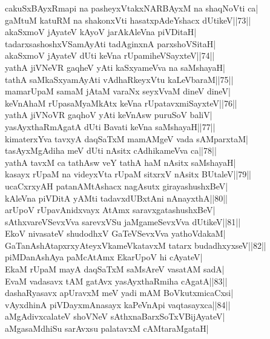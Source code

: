\documentclass{article}
\begin{document}
cakuSxBAyxRmapi na pasheyxVtakxNARBAyxM na shaqNoVti ca|\\
gaMtuM katuRM na shakonxVti hasatxpAdeYshacx dUtikeV||73||\\
akaSxmoV jAyateV kAyoV jarAkAleVna piVDitaH|\\
tadarxsashoshxVSamAyAti tadAginxnA parxshoVSitaH|\\
akaSxmoV jAyateV dUti keVna rUpamiheVSayxteV||74||\\
yathA jiVNeVR gaqheV yAti kaSxyameVva na saMshayaH|\\
tathA saMkaSxyamAyAti vAdhaRkeyxVtu kaLeVbaraM||75||\\
mamarUpaM samaM jAtaM varaNx seyxVvaM dineV dineV|\\
keVnAhaM rUpasaMyaMkAtx keVna rUpatavxmiSayxteV||76||\\
yathA jiVNoVR gaqhoV yAti keVnAsw puruSoV baliV|\\
yasAyxthaRmAgatA dUti Bavati keVna saMshayaH||77||\\
kimaterxYva tavxyA daqSaTxM mamAMgeV vada sAMparxtaM|\\
tasAyxMgAdiha meV dUti nAsitx cAdhikameVva ca||78||\\
yathA tavxM ca tathAsw veY tathA haM nAsitx saMshayaH|\\
kasayx rUpaM na videyxVta rUpaM sitxrxV nAsitx BUtaleV||79||\\
ucaCxrxyAH patanAMtAshacx nagAsutx girayashushxBeV|\\
kAleVna piVDitA yAMti tadavxdUBxtAni nAnayxthA||80||\\
arUpoV rUpavAnidxvayx AtAmx saravxgatashushxBeV|\\
sAthxvareVSevxVva sarevxVSu jaMgameSevxVva dUtikeV||81||\\
EkoV nivasateV shudodhxV GaTeVSevxVva yathoVdakaM|\\
GaTanAshAtapxrxyAteyxVkameVkatavxM tatarx budadhxyxseV||82||\\
piMDanAshAya paMcAtAmx EkarUpoV hi cAyateV|\\
EkaM rUpaM mayA daqSaTxM saMsAreV vasatAM sadA|\\
EvaM vadasavx tAM gatAvx yasAyxthaRmiha cAgatA||83||\\
dashaRyasavx apUravxM meV yadi mAM BoVkutxmicaCxsi|\\
vAyxdhinA piVDayxmAnasayx kaPeVnApi vaqtasayxca||84||\\
aMgAdivxcalateV shoVNeV sAthxnaBarxSoTxVBijAyateV|\\
aMgasaMdhiSu sarAvxsu palatavxM cAMtaraMgataH|\\
\end{document}
